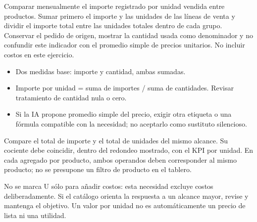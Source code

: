 \label{aw05}
\begin{goal}
Comparar mensualmente el importe registrado por unidad vendida entre productos. Sumar primero el importe y las unidades de las líneas de venta y dividir el importe total entre las unidades totales dentro de cada grupo. Conservar el pedido de origen, mostrar la cantidad usada como denominador y no confundir este indicador con el promedio simple de precios unitarios. No incluir costos en este ejercicio.
\end{goal}
\begin{itemize}
\item Dos medidas base: importe y cantidad, ambas sumadas.
\item Importe por unidad = suma de importes / suma de cantidades. Revisar tratamiento de cantidad nula o cero.
\item Si la IA propone promedio simple del precio, exigir otra etiqueta o una fórmula compatible con la necesidad; no aceptarlo como sustituto silencioso.
\end{itemize}
\begin{good}
Compare el total de importe y el total de unidades del mismo alcance. Su cociente debe coincidir, dentro del redondeo mostrado, con el KPI por unidad. En cada agregado por producto, ambos operandos deben corresponder al mismo producto; no se presupone un filtro de producto en el tablero.
\end{good}
\begin{note}
No se marca U sólo para añadir costos: esta necesidad excluye costos deliberadamente. Si el catálogo orienta la respuesta a un alcance mayor, revise y mantenga el objetivo. Un valor por unidad no es automáticamente un precio de lista ni una utilidad.
\end{note}

